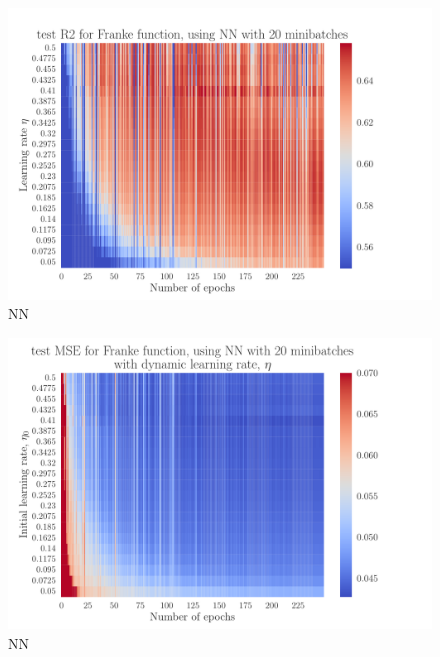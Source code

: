 \documentclass[12pt]{extarticle}
\begin{document}
\begin{figure}[h!]
	\includegraphics[width=\linewidth]{NN_Franke/NN_Franke__epochs_eta__test_R2__190748.pdf}
	\caption{NN}
	\label{fig:NN_Franke_epochs_eta_R2}
\end{figure}

\begin{figure}[h!]
	\includegraphics[width=\linewidth]{NN_Franke/NN_Franke__epochs_dynamic_eta__test_MSE__489375.pdf}
	\caption{NN}
	\label{fig:NN_Franke_epochs_dynamic_eta}
\end{figure}
\end{document}
